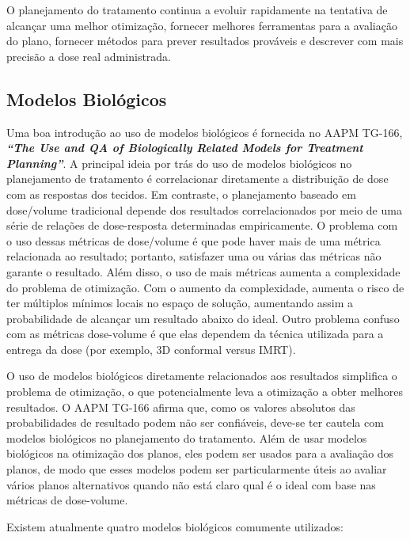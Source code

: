 \documentclass[11pt,a4paper]{article}
\newcounter{exemplo}
\begin{document}
	O planejamento do tratamento continua a evoluir rapidamente na tentativa de alcançar uma melhor otimização, fornecer melhores ferramentas para a avaliação do plano, fornecer métodos para prever resultados prováveis e descrever com mais precisão a dose real administrada.

\subsection*{Modelos Biológicos}

	Uma boa introdução ao uso de modelos biológicos é fornecida no AAPM TG-166, \textbf{\textit{``The Use and QA of Biologically Related Models for Treatment Planning''}}. A principal ideia por trás do uso de modelos biológicos no planejamento de tratamento é correlacionar diretamente a distribuição de dose com as respostas dos tecidos. Em contraste, o planejamento baseado em dose/volume tradicional depende dos resultados correlacionados por meio de uma série de relações de dose-resposta determinadas empiricamente. O problema com o uso dessas métricas de dose/volume é que pode haver mais de uma métrica relacionada ao resultado; portanto, satisfazer uma ou várias das métricas não garante o resultado. Além disso, o uso de mais métricas aumenta a complexidade do problema de otimização. Com o aumento da complexidade, aumenta o risco de ter múltiplos mínimos locais no espaço de solução, aumentando assim a probabilidade de alcançar um resultado abaixo do ideal. Outro problema confuso com as métricas dose-volume é que elas dependem da técnica utilizada para a entrega da dose (por exemplo, 3D conformal versus IMRT).

	O uso de modelos biológicos diretamente relacionados aos resultados simplifica o problema de otimização, o que potencialmente leva a otimização a obter melhores resultados. O AAPM TG-166 afirma que, como os valores absolutos das probabilidades de resultado podem não ser confiáveis, deve-se ter cautela com modelos biológicos no planejamento do tratamento. Além de usar modelos biológicos na otimização dos planos, eles podem ser usados para a avaliação dos planos, de modo que esses modelos podem ser particularmente úteis ao avaliar vários planos alternativos quando não está claro qual é o ideal com base nas métricas de dose-volume.

	Existem atualmente quatro modelos biológicos comumente utilizados:
\end{document}
